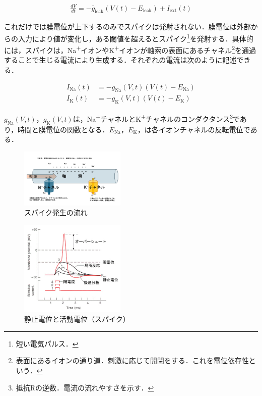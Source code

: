 \documentclass[dvipdfmx, A4j, twocolumn, 10.5pt]{jsarticle}
\begin{document}
\begin{align*}
\frac{dV}{dt} = -\bar{g}_{\text{leak}} \left( V(t) - E_{\text{leak}} \right) + I_{\text{ext}}(t)
\end{align*}

これだけでは膜電位が上下するのみでスパイクは発射されない．膜電位は外部からの入力により値が変化し，ある閾値を超えるとスパイク\footnote{短い電気パルス．}を発射する．具体的には，スパイクは，Na\textsuperscript{+}イオンやK\textsuperscript{+}イオンが軸索の表面にあるチャネル\footnote{表面にあるイオンの通り道．刺激に応じて開閉をする．これを電位依存性という．}を通過することで生じる電流により生成する．それぞれの電流は次のように記述できる．

\begin{align*}
I_{\text{Na}}(t) &= -g_{\text{Na}}(V,t)(V(t) - E_{\text{Na}}) \\
I_{\text{K}}(t) &= -g_{\text{K}}(V,t)(V(t) - E_{\text{K}})
\end{align*}

$g_{\text{Na}}(V,t)$，$g_{\text{K}}(V,t)$は，Na\textsuperscript{+}チャネルとK\textsuperscript{+}チャネルのコンダクタンス\footnote{抵抗Rの逆数．電流の流れやすさを示す．}であり，時間と膜電位の関数となる．$E_{\text{Na}}$，$E_{\text{K}}$，は各イオンチャネルの反転電位である．

\begin{figure}[h]
 \centering
 \includegraphics[width=0.45\textwidth]{spike.png}
 \caption{スパイク発生の流れ} 
\end{figure}


\begin{figure}[h]
 \centering
 \includegraphics[width=0.45\textwidth]{actpot.jpg}
 \caption{静止電位と活動電位（スパイク） \cite{lite1}} 
\end{figure}
\end{document}
